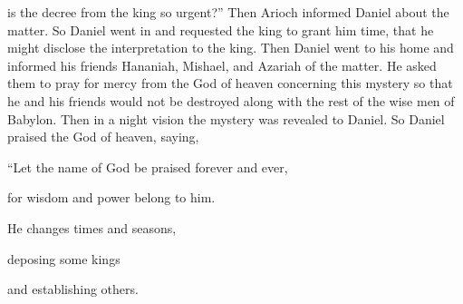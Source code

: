 {is the decree
from
the king
so urgent?” Then
Arioch
informed
Daniel
about the matter.
So Daniel
went in
and requested
the king
to grant
him time,
that
he might disclose
the interpretation
to the king.
Then
Daniel
went to
his home
and informed
his friends
Hananiah,
Mishael,
and Azariah
of the matter.
He asked
them to
pray for mercy
from
the God
of heaven
concerning
this
mystery
so that
he
and his friends
would not
be destroyed
along with
the rest
of the wise men
of Babylon.
Then
in a night
vision
the mystery
was revealed
to Daniel.
So
Daniel
praised
the God
of heaven,
saying,
\par }{\Q “Let the name
of
God
be
praised
forever
and
ever,
\par }{\Q for
wisdom
and power
belong to him.
\par }{\Q {}He
changes
times
and seasons,
\par }{\Q deposing
some kings
\par }{\Q and establishing
others.

}
